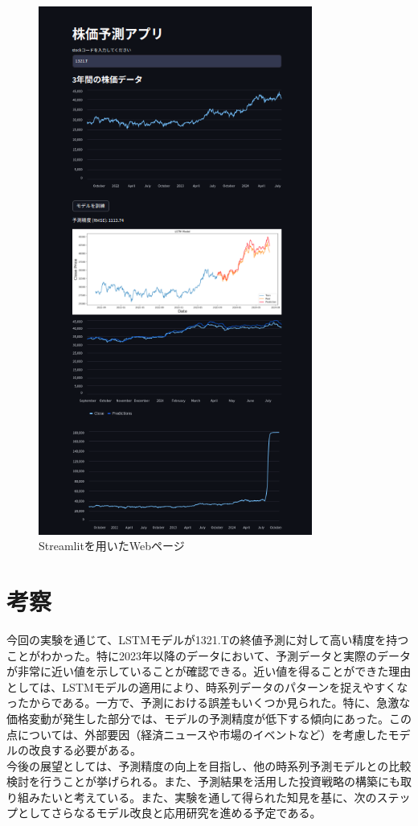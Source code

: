 \documentclass[a4paper, 11pt, titlepage]{jsarticle}
\begin{document}
\begin{figure}[htbp]
  \centering
  \includegraphics[width=90mm]{./image/image.png}
  \caption{Streamlitを用いたWebページ}
  \label{Streamlit}
\end{figure}
\clearpage
\section{考察}
\indent 今回の実験を通じて、LSTMモデルが1321.Tの終値予測に対して高い精度を持つことがわかった。特に2023年以降のデータにおいて、予測データと実際のデータが非常に近い値を示していることが確認できる。近い値を得ることができた理由としては、LSTMモデルの適用により、時系列データのパターンを捉えやすくなったからである。一方で、予測における誤差もいくつか見られた。特に、急激な価格変動が発生した部分では、モデルの予測精度が低下する傾向にあった。この点については、外部要因（経済ニュースや市場のイベントなど）を考慮したモデルの改良する必要がある。\\
\indent 今後の展望としては、予測精度の向上を目指し、他の時系列予測モデルとの比較検討を行うことが挙げられる。また、予測結果を活用した投資戦略の構築にも取り組みたいと考えている。また、実験を通して得られた知見を基に、次のステップとしてさらなるモデル改良と応用研究を進める予定である。
\end{document}

